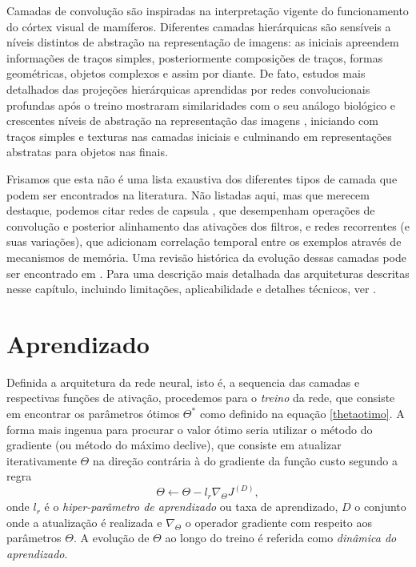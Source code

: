 Camadas de convolução são inspiradas na interpretação vigente do funcionamento do córtex visual de mamíferos. Diferentes camadas hierárquicas são sensíveis a níveis distintos de abstração na representação de imagens: as iniciais apreendem informações de traços simples, posteriormente composições de traços, formas geométricas, objetos complexos e assim por diante. De fato, estudos mais detalhados das projeções hierárquicas aprendidas por redes convolucionais profundas após o treino mostraram similaridades com o seu análogo biológico \cite{lee2008sparse} e crescentes níveis de abstração na representação das imagens \cite{Gatys2015, gatys2016image}, iniciando com traços simples e texturas nas camadas iniciais e culminando em representações abstratas para objetos nas finais.

Frisamos que esta não é uma lista exaustiva dos diferentes tipos de camada que podem ser encontrados na literatura. Não listadas aqui, mas que merecem destaque, podemos citar redes de capsula \cite{sabour2017dynamic}, que desempenham operações de convolução e posterior alinhamento das ativações dos filtros, e redes recorrentes (e suas variações), que adicionam correlação temporal entre os exemplos através de mecanismos de memória. Uma revisão histórica da evolução dessas camadas pode ser encontrado em \cite{jurgenReview2015}. Para uma descrição mais detalhada das arquiteturas descritas nesse capítulo, incluindo limitações, aplicabilidade e detalhes técnicos, ver \cite{Goodfellow-et-al-2016}.

\section{Aprendizado}\label{sec:aprendizado}

Definida a arquitetura da rede neural, isto é, a sequencia das camadas e respectivas funções de ativação, procedemos para o \textit{treino} da rede, que consiste em encontrar os parâmetros ótimos $\Theta^*$ como definido na equação \ref{thetaotimo}. A forma mais ingenua para procurar o valor ótimo seria utilizar o método do gradiente (ou método do máximo declive), que consiste em atualizar iterativamente $\Theta$ na direção contrária à do gradiente da função custo segundo a regra 
\begin{equation}
\Theta \leftarrow \Theta - l_r \nabla_{\Theta} J^{(D)},
\end{equation}
onde $l_r$ é o \textit{hiper-parâmetro de aprendizado} ou taxa de aprendizado, $D$ o conjunto onde a atualização é realizada e $\nabla_{\Theta}$ o operador gradiente com respeito aos parâmetros $\Theta$. A evolução de $\Theta$ ao longo do treino é referida como \textit{dinâmica do aprendizado}.

